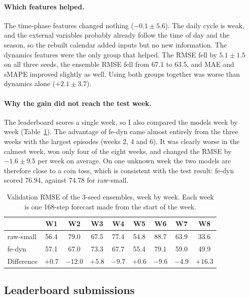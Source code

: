 \documentclass[a4, 12pt]{article}
\begin{document}
\paragraph{Which features helped.} The time-phase features changed nothing ($-0.1 \pm 5.6$). The daily cycle is weak, and the external variables probably already follow the time of day and the season, so the rebuilt calendar added inputs but no new information. The dynamics features were the only group that helped. The RMSE fell by $5.1 \pm 1.5$ on all three seeds, the ensemble RMSE fell from 67.1 to 63.5, and MAE and sMAPE improved slightly as well. Using both groups together was worse than dynamics alone ($+2.1 \pm 3.7$).

\paragraph{Why the gain did not reach the test week.} The leaderboard scores a single week, so I also compared the models week by week (Table~\ref{tab:weeks}). The advantage of fe-dyn came almost entirely from the three weeks with the largest episodes (weeks 2, 4 and 6). It was clearly worse in the calmest week, won only four of the eight weeks, and changed the RMSE by $-1.6 \pm 9.5$ per week on average. On one unknown week the two models are therefore close to a coin toss, which is consistent with the test result: fe-dyn scored 76.94, against 74.78 for raw-small.

\begin{table}[h]
\centering
\caption{Validation RMSE of the 3-seed ensembles, week by week. Each week is one 168-step forecast made from the start of the week.}
\label{tab:weeks}
\small
\begin{tabular}{lcccccccc}
\toprule
 & W1 & W2 & W3 & W4 & W5 & W6 & W7 & W8 \\
\midrule
raw-small & 56.4 & 79.0 & 67.5 & 77.4 & 54.8 & 88.7 & 63.9 & 33.6 \\
fe-dyn & 57.1 & 67.0 & 73.3 & 67.7 & 55.4 & 79.1 & 59.0 & 49.9 \\
Difference & $+0.7$ & $-12.0$ & $+5.8$ & $-9.7$ & $+0.6$ & $-9.6$ & $-4.9$ & $+16.3$ \\
\bottomrule
\end{tabular}
\end{table}
\subsection{Leaderboard submissions}
\end{document}
